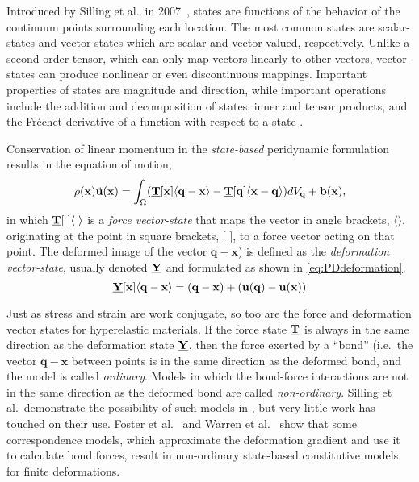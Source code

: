 \documentclass[preprint,review,12pt]{elsarticle}
\newcommand\vstate[3]{%
	\mathbf{\underline{#1}}%
	\ifstrempty{#2}{}{[#2]}%
	\ifstrempty{#3}{}{\langle #3 \rangle}}
\begin{document}
Introduced by Silling et al.\ in 2007~\cite{silling2007peridynamic}, states are functions of the behavior of the continuum points surrounding each location.
The most common states are scalar-states and vector-states which are scalar and vector valued, respectively.
Unlike a second order tensor, which can only map vectors linearly to other vectors, vector-states can produce nonlinear or even discontinuous mappings.  Important properties of states are magnitude and direction, while important operations include the addition and decomposition of states, inner and tensor products, and the Fr\'{e}chet derivative of a function with respect to a state \cite{silling2007peridynamic}.

Conservation of linear momentum in the \textit{state-based} peridynamic formulation results in the equation of motion,
%
\begin{equation}
\label{eq:PDstateEoM}
\rho(\mathbf{x})\ddot{\mathbf{u}}(\mathbf{x}) = \int_\Omega (\vstate{T}{\mathbf{x}}{\mathbf{q}-\mathbf{x}}-\vstate{T}{\mathbf{q}}{\mathbf{x}-\mathbf{q}}) dV_\mathbf{q}  + \mathbf{b}(\mathbf{x}),\notag
\end{equation}
%
in which $\vstate{T}{\;}{\;}$ is a \textit{force vector-state} that maps the vector in angle brackets, $\langle \rangle$, originating at the point in square brackets, [ ], to a force vector acting on that point.
The deformed image of the vector $\mathbf{q-x}$) is defined as the \textit{deformation vector-state}, usually denoted $\vstate{Y}{}{}$ and formulated as shown in \cref{eq:PDdeformation}. 
%
\begin{equation}
\label{eq:PDdeformation}
\vstate{Y}{\mathbf{x}}{\mathbf{q}-\mathbf{x}} = (\mathbf{q}-\mathbf{x}) + (\mathbf{u}(\mathbf{q})-\mathbf{u}(\mathbf{x}))
\end{equation}
%

Just as stress and strain are work conjugate, so too are the force and deformation vector states for hyperelastic materials.
If the force state $\vstate{T}{}{}$ is always in the same direction as the deformation state $\vstate{Y}{}{}$, then the force exerted by a ``bond'' (i.e.\ the vector $\mathbf{q-x}$ between points is in the same direction as the deformed bond, and the model is called \textit{ordinary}.  
Models in which the bond-force interactions are not in the same direction as the deformed bond are called \textit{non-ordinary}.
Silling et al.\ demonstrate the possibility of such models in \cite{silling2010peridynamic}, but very little work has touched on their use.  Foster et al.\ \cite{foster2010viscoplasticity} and Warren et al.\ \cite{warren2009non} show that some correspondence models, which approximate the deformation gradient and use it to calculate bond forces, result in non-ordinary state-based constitutive models for finite deformations.
%
\FloatBarrier
%
\end{document}
